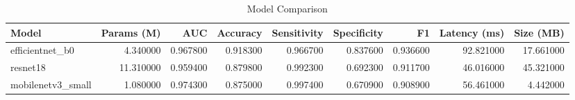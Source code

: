 \begin{table}
\caption{Model Comparison}
\label{tab:models}
\begin{tabular}{lrrrrrrrr}
\toprule
Model & Params (M) & AUC & Accuracy & Sensitivity & Specificity & F1 & Latency (ms) & Size (MB) \\
\midrule
efficientnet\_b0 & 4.340000 & 0.967800 & 0.918300 & 0.966700 & 0.837600 & 0.936600 & 92.821000 & 17.661000 \\
resnet18 & 11.310000 & 0.959400 & 0.879800 & 0.992300 & 0.692300 & 0.911700 & 46.016000 & 45.321000 \\
mobilenetv3\_small & 1.080000 & 0.974300 & 0.875000 & 0.997400 & 0.670900 & 0.908900 & 56.461000 & 4.442000 \\
\bottomrule
\end{tabular}
\end{table}
